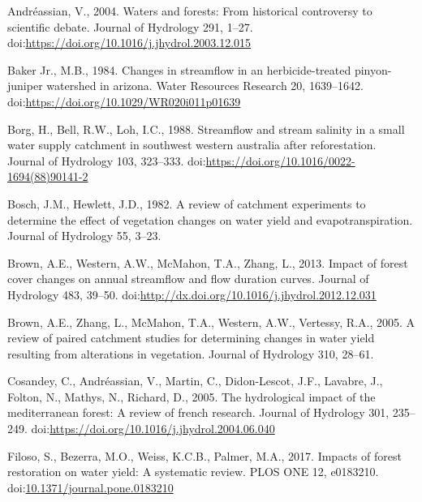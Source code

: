 \documentclass[]{elsarticle} %
\begin{document}
\hypertarget{refs}{}
\leavevmode\hypertarget{ref-andreassian2004}{}%
Andréassian, V., 2004. Waters and forests: From historical controversy to scientific debate. Journal of Hydrology 291, 1--27. doi:\href{https://doi.org/https://doi.org/10.1016/j.jhydrol.2003.12.015}{https://doi.org/10.1016/j.jhydrol.2003.12.015}

\leavevmode\hypertarget{ref-baker1984}{}%
Baker Jr., M.B., 1984. Changes in streamflow in an herbicide-treated pinyon-juniper watershed in arizona. Water Resources Research 20, 1639--1642. doi:\href{https://doi.org/https://doi.org/10.1029/WR020i011p01639}{https://doi.org/10.1029/WR020i011p01639}

\leavevmode\hypertarget{ref-borg1988}{}%
Borg, H., Bell, R.W., Loh, I.C., 1988. Streamflow and stream salinity in a small water supply catchment in southwest western australia after reforestation. Journal of Hydrology 103, 323--333. doi:\href{https://doi.org/https://doi.org/10.1016/0022-1694(88)90141-2}{https://doi.org/10.1016/0022-1694(88)90141-2}

\leavevmode\hypertarget{ref-hewlett1984}{}%
Bosch, J.M., Hewlett, J.D., 1982. A review of catchment experiments to determine the effect of vegetation changes on water yield and evapotranspiration. Journal of Hydrology 55, 3--23.

\leavevmode\hypertarget{ref-brown2013}{}%
Brown, A.E., Western, A.W., McMahon, T.A., Zhang, L., 2013. Impact of forest cover changes on annual streamflow and flow duration curves. Journal of Hydrology 483, 39--50. doi:\href{https://doi.org/http://dx.doi.org/10.1016/j.jhydrol.2012.12.031}{http://dx.doi.org/10.1016/j.jhydrol.2012.12.031}

\leavevmode\hypertarget{ref-brown2005}{}%
Brown, A.E., Zhang, L., McMahon, T.A., Western, A.W., Vertessy, R.A., 2005. A review of paired catchment studies for determining changes in water yield resulting from alterations in vegetation. Journal of Hydrology 310, 28--61.

\leavevmode\hypertarget{ref-cosandey2005}{}%
Cosandey, C., Andréassian, V., Martin, C., Didon-Lescot, J.F., Lavabre, J., Folton, N., Mathys, N., Richard, D., 2005. The hydrological impact of the mediterranean forest: A review of french research. Journal of Hydrology 301, 235--249. doi:\href{https://doi.org/https://doi.org/10.1016/j.jhydrol.2004.06.040}{https://doi.org/10.1016/j.jhydrol.2004.06.040}

\leavevmode\hypertarget{ref-filoso2017}{}%
Filoso, S., Bezerra, M.O., Weiss, K.C.B., Palmer, M.A., 2017. Impacts of forest restoration on water yield: A systematic review. PLOS ONE 12, e0183210. doi:\href{https://doi.org/10.1371/journal.pone.0183210}{10.1371/journal.pone.0183210}
\end{document}
